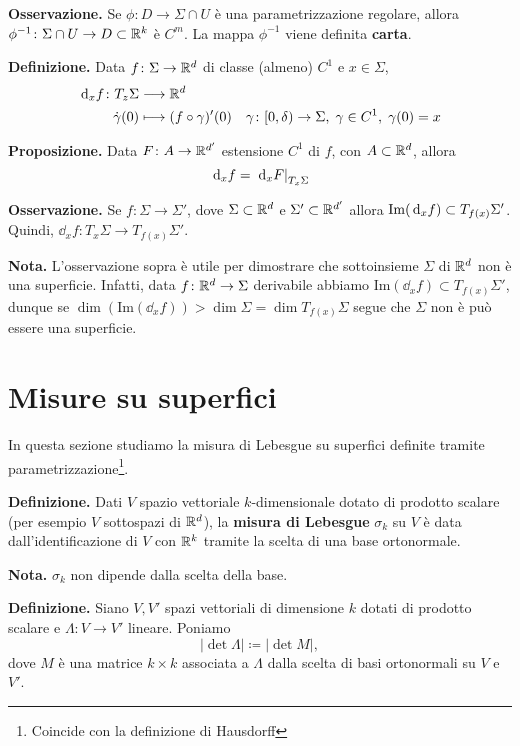 \textbf{Osservazione.} Se $\phi \colon D \to \Sigma \cap U$ è una parametrizzazione regolare, allora $\phi^{-1} \colon \Sigma \cap U \to D \subset \mathbb R^k$ è $C^m$. La mappa $\phi^{-1}$ viene definita \textbf{carta}.

\textbf{Definizione.} Data $f \colon \Sigma \to \mathbb R^{d}$ di classe (almeno) $C^1$ e $x \in \Sigma$, 
%
\begin{align*}
	\,\mathrm{d}_x f \colon  T_z \Sigma & \longrightarrow \mathbb R^{d} \\
	\dot \gamma(0) & \longmapsto (f \circ \gamma)' (0) \quad \gamma \colon [0,\delta) \to \Sigma, \; \gamma \in C^1, \; \gamma(0) = x
\end{align*}


\textbf{Proposizione.} Data $F \colon A \to \mathbb R^{d'}$ estensione $C^1$ di $f$, con $A \subset \mathbb R^d$, allora
%
$$
	\,\mathrm{d}_x f = \left.\,\mathrm{d}_x F\right|_{T_x \Sigma}
$$
%

\textbf{Osservazione.} Se $f \colon \Sigma \to \Sigma'$, dove $\Sigma \subset \mathbb R^d$ e $\Sigma' \subset \mathbb R^{d'}$ allora $\operatorname{Im}(\,\mathrm{d}_x f) \subset T_{f(x)} \Sigma'$.
Quindi, $\dd_x f \colon T_x \Sigma \to T_{f(x)} \Sigma'$.

\textbf{Nota.} L'osservazione sopra è utile per dimostrare che sottoinsieme $\Sigma$ di $\mathbb R^d$ non è una superficie. Infatti, data $f \colon \mathbb R^d \to \Sigma$ derivabile abbiamo $\text{Im}(\dd_x f) \subset T_{f(x)} \Sigma'$, dunque se $\dim(\text{Im}(\dd_x f)) > \dim \Sigma = \dim T_{f(x)} \Sigma$ segue che $\Sigma$ non è può essere una superficie.

\newpage

\section{Misure su superfici}

In questa sezione studiamo la misura di Lebesgue su superfici definite tramite parametrizzazione\footnote{Coincide con la definizione di Hausdorff}.

\textbf{Definizione.} Dati $V$ spazio vettoriale $k$-dimensionale dotato di prodotto scalare (per esempio $V$ sottospazi di $\mathbb R^d$), la \textbf{misura di Lebesgue} $\sigma_k$ su $V$ è data dall'identificazione di $V$ con $\mathbb R^k$ tramite la scelta di una base ortonormale.

\textbf{Nota.} $\sigma_k$ non dipende dalla scelta della base.


\textbf{Definizione.} Siano $V,V'$ spazi vettoriali di dimensione $k$ dotati di prodotto scalare e $\Lambda \colon V \to V'$ lineare. Poniamo
%
$$
	|\det \Lambda| \coloneqq |\det M|,
$$
%
dove $M$ è una matrice $k \times k$ associata a $\Lambda$ dalla scelta di basi ortonormali su $V$ e $V'$.

